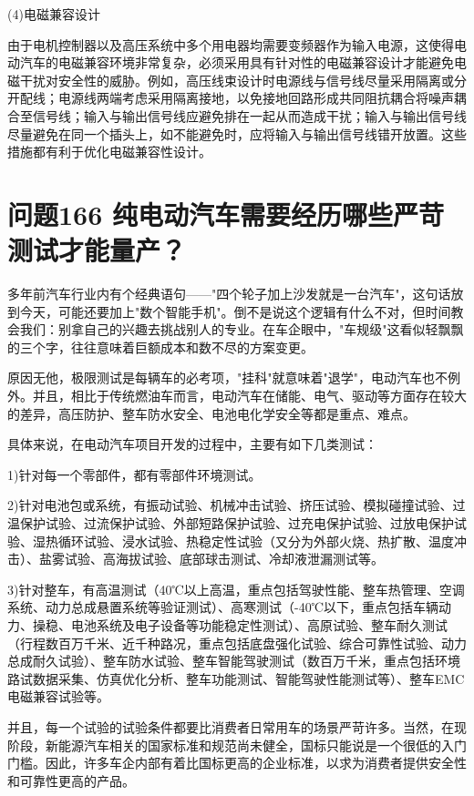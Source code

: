 \documentclass[12pt,UTF8]{ctexbook}
\begin{document}
(4)电磁兼容设计

由于电机控制器以及高压系统中多个用电器均需要变频器作为输入电源，这使得电动汽车的电磁兼容环境非常复杂，必须采用具有针对性的电磁兼容设计才能避免电磁干扰对安全性的威胁。例如，高压线束设计时电源线与信号线尽量采用隔离或分开配线；电源线两端考虑采用隔离接地，以免接地回路形成共同阻抗耦合将噪声耦合至信号线；输入与输出信号线应避免排在一起从而造成干扰；输入与输出信号线尽量避免在同一个插头上，如不能避免时，应将输入与输出信号线错开放置。这些措施都有利于优化电磁兼容性设计。

\section{问题166 纯电动汽车需要经历哪些严苛测试才能量产？}

多年前汽车行业内有个经典语句——"四个轮子加上沙发就是一台汽车"，这句话放到今天，可能还要加上"数个智能手机"。倒不是说这个逻辑有什么不对，但时间教会我们：别拿自己的兴趣去挑战别人的专业。在车企眼中，"车规级"这看似轻飘飘的三个字，往往意味着巨额成本和数不尽的方案变更。

原因无他，极限测试是每辆车的必考项，"挂科"就意味着"退学"，电动汽车也不例外。并且，相比于传统燃油车而言，电动汽车在储能、电气、驱动等方面存在较大的差异，高压防护、整车防水安全、电池电化学安全等都是重点、难点。

具体来说，在电动汽车项目开发的过程中，主要有如下几类测试：

1)针对每一个零部件，都有零部件环境测试。

2)针对电池包或系统，有振动试验、机械冲击试验、挤压试验、模拟碰撞试验、过温保护试验、过流保护试验、外部短路保护试验、过充电保护试验、过放电保护试验、湿热循环试验、浸水试验、热稳定性试验（又分为外部火烧、热扩散、温度冲击）、盐雾试验、高海拔试验、底部球击测试、冷却液泄漏测试等。

3)针对整车，有高温测试（40℃以上高温，重点包括驾驶性能、整车热管理、空调系统、动力总成悬置系统等验证测试）、高寒测试（-40℃以下，重点包括车辆动力、操稳、电池系统及电子设备等功能稳定性测试）、高原试验、整车耐久测试（行程数百万千米、近千种路况，重点包括底盘强化试验、综合可靠性试验、动力总成耐久试验）、整车防水试验、整车智能驾驶测试（数百万千米，重点包括环境路试数据采集、仿真优化分析、整车功能测试、智能驾驶性能测试等）、整车EMC电磁兼容试验等。

并且，每一个试验的试验条件都要比消费者日常用车的场景严苛许多。当然，在现阶段，新能源汽车相关的国家标准和规范尚未健全，国标只能说是一个很低的入门门槛。因此，许多车企内部有着比国标更高的企业标准，以求为消费者提供安全性和可靠性更高的产品。
\end{document}
